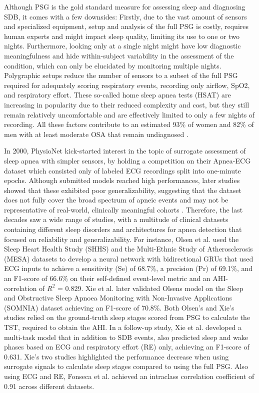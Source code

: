 Although PSG is the gold standard measure for assessing sleep and diagnosing SDB, it comes with a few downsides: Firstly, due to the vast amount of sensors and specialized equipment, setup and analysis of the full PSG is costly, requires human experts and might impact sleep quality, limiting its use to one or two nights. Furthermore, looking only at a single night might have low diagnostic meaningfulness \cite{toussaint1995first} and hide within-subject variability in the assessment of the condition, which can only be elucidated by monitoring multiple nights.
Polygraphic setups reduce the number of sensors to a subset of the full PSG required for adequately scoring respiratory events, recording only airflow, SpO2, and respiratory effort. These so-called home sleep apnea tests (HSAT) are increasing in popularity due to their reduced complexity and cost, but they still remain relatively uncomfortable and are effectively limited to only a few nights of recording.
All these factors contribute to an estimated 93\% of women and 82\% of men with at least moderate OSA that remain undiagnosed \cite{young1997estimation}.

In 2000, PhysioNet kick-started interest in the topic of surrogate assessment of sleep apnea with simpler sensors, by holding a competition on their Apnea-ECG dataset which consisted only of labeled ECG recordings split into one-minute epochs. Although submitted models reached high performances, later studies showed that these exhibited poor generalizability, suggesting that the dataset does not fully cover the broad spectrum of apneic events and may not be representative of real-world, clinically meaningful cohorts \cite{papini2018generalizability}. Therefore, the last decades saw a wide range of studies, with a multitude of clinical datasets containing different sleep disorders and architectures for apnea detection that focused on reliability and generalizability.
For instance, Olsen et al. \cite{olsen2020robust} used the Sleep Heart Health Study (SHHS) \cite{quan1997sleep} and the Multi-Ethnic Study of Atherosclerosis (MESA) \cite{chen2015racial} datasets to develop a neural network with bidirectional GRUs that used ECG inputs to achieve a sensitivity (Se) of 68.7\%, a precision (Pr) of 69.1\%, and an F1-score of 66.6\% on their self-defined event-level metric and an AHI-correlation of $R^2$ = 0.829. Xie et al. \cite{xie2023use} later validated Olsens model on the Sleep and Obstructive Sleep Apnoea Monitoring with Non-Invasive Applications (SOMNIA) \cite{van2019protocol} dataset achieving an F1-score of 70.8\%. Both Olsen's and Xie's studies relied on the ground-truth sleep stages scored from PSG to calculate the TST, required to obtain the AHI. In a follow-up study, Xie et al. \cite{xie2024multi} developed a multi-task model that in addition to SDB events, also predicted sleep and wake phases based on ECG and respiratory effort (RE) only, achieving an F1-score of 0.631. Xie's two studies highlighted the performance decrease when using surrogate signals to calculate sleep stages compared to using the full PSG. Also using ECG and RE, Fonseca et al. \cite{fonseca2024estimating} achieved an intraclass correlation coefficient of 0.91 across different datasets.

